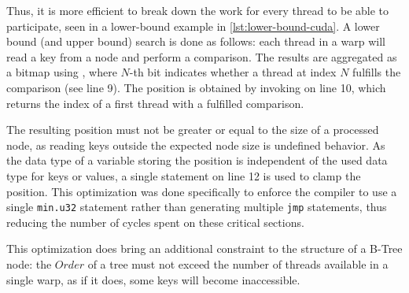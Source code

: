 Thus, it is more efficient to break down the work for every thread to be able to participate, seen in a lower-bound example in \cref{lst:lower-bound-cuda}. A lower bound (and upper bound) search is done as follows: each thread in a warp will read a key from a node and perform a comparison. The results are aggregated as a bitmap using , where $N$-th bit indicates whether a thread at index $N$ fulfills the comparison (see line 9). The position is obtained by invoking  on line 10, which returns the index of a first thread with a fulfilled comparison.

The resulting position must not be greater or equal to the size of a processed node, as reading keys outside the expected node size is undefined behavior. As the data type of a variable storing the position is independent of the used data type for keys or values, a single  statement on line 12 is used to clamp the position. This optimization was done specifically to enforce the compiler to use a single \texttt{min.u32} statement rather than generating multiple \texttt{jmp} statements, thus reducing the number of cycles spent on these critical sections.

This optimization does bring an additional constraint to the structure of a B-Tree node: the $Order$ of a tree must not exceed the number of threads available in a single warp, as if it does, some keys will become inaccessible.
